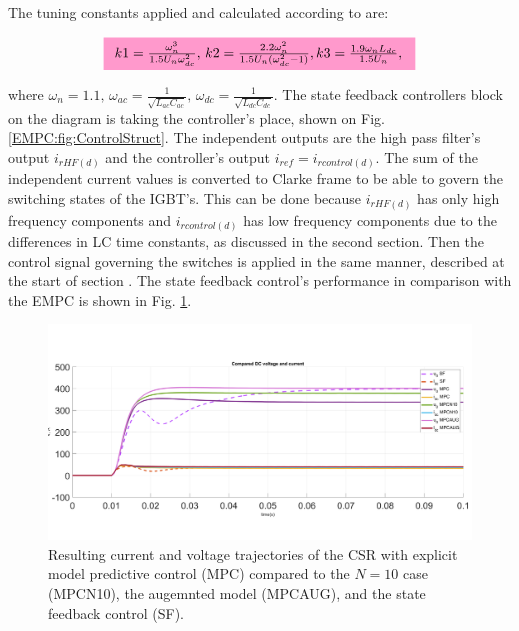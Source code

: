     The tuning constants applied and calculated according to \cite{godlewska2015predictive} are:

    \begin{equation}
    \hlcmath{PT}{
        \begin{array}{l}
            k1=\frac{\omega^3_n}{1.5U_n\omega^2_{dc}},\,k2=\frac{2.2\omega^2_n}{1.5U_n(\omega^2_{dc}-1)},k3=\frac{1.9\omega_n L_{dc}}{1.5U_n},\,\\
        \end{array}}
        \label{EMPC:equ:tuning}
    \end{equation}

    where $\omega_n=1.1,\,\omega_{ac}=\frac{1}{\sqrt{L_{ac}C_{ac}}},\,\omega_{dc}=\frac{1}{\sqrt{L_{dc}C_{dc}}}$. The state feedback controllers block on the diagram is taking the controller's place, shown on Fig. \ref{EMPC:fig:ControlStruct}. The independent outputs are the high pass filter's output  $i_{rHF(d)}$ and the controller's output $i_{ref}=i_{rcontrol(d)}$. The sum of the independent current values is converted to Clarke frame to be able to govern the switching states of the IGBT's. This can be done because $i_{rHF(d)}$ has only high frequency components and $i_{rcontrol(d)}$ has low frequency components due to the differences in LC time constants, as discussed in the second section. Then the control signal governing the switches is applied in the same manner, described at the start of section .
    The state feedback control's performance in comparison with the EMPC is shown in Fig. \ref{EMPC:fig:Result_EMPCfinal}.

    \begin{figure}[!ht]
        \centering
        \includegraphics[width=\textwidth]{EMPC_PNG_Pics/Compare.png}
        \caption{Resulting current and voltage trajectories of the CSR with explicit model predictive control (MPC) compared to the $N=10$ case (MPCN10), the augemnted model (MPCAUG), and the state feedback control (SF).}
        \label{EMPC:fig:Result_EMPCfinal}
    \end{figure}

